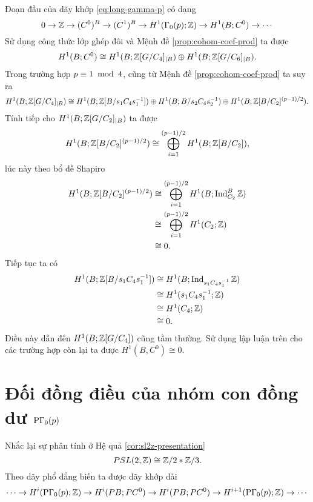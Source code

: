 \startproof Đoạn đầu của dãy khớp \ref{eq:long-gamma-p} có dạng
$$
    0 \rightarrow \mathbb Z \rightarrow (C^0)^B \rightarrow (C^1)^B \rightarrow H^1(\Gamma_0(p); \mathbb Z) \rightarrow H^1(B; C^0) \rightarrow \cdots
$$
Sử dụng công thức lớp ghép đôi và Mệnh đề \ref{prop:cohom-coef-prod} ta được
$$
    H^1(B;C^0) \cong H^1(B; \mathbb Z[G/C_4]_{|B}) \oplus H^1(B;\mathbb Z[G/C_6]_{|B}).
$$
Trong trường hợp $p \equiv 1 \mmod 4$, cũng từ Mệnh đề \ref{prop:cohom-coef-prod} ta suy ra
$$
    H^1(B;\mathbb Z[G/C_4]_{|B}) \cong H^1(B;\mathbb Z[B/s_1C_4s_1^{-1}]) \oplus H^1(B;B/s_2C_4s_2^{-1}) \oplus H^1(B;\mathbb Z[B/C_2]^{(p-1)/2}).
$$
Tính tiếp cho $H^1(B;\mathbb Z[G/C_2]_{|B})$ ta được
$$
    H^1(B;\mathbb Z[B/C_2]^{(p-1)/2}) \cong \bigoplus_{i=1}^{(p-1)/2} H^1(B;\mathbb Z[B/C_2]),
$$
lúc này theo bổ đề Shapiro
\begin{align*}
    H^1(B;\mathbb Z[B/C_2]^{(p-1)/2}) & \cong \bigoplus_{i=1}^{(p-1)/2} H^1(B;\operatorname{Ind}_{C_2}^B\mathbb Z) \\
                               & \cong \bigoplus_{i=1}^{(p-1)/2} H^1(C_2;\mathbb Z)           \\
                               & \cong 0.
\end{align*}
Tiếp tục ta có
\begin{align*}
    H^1(B;\mathbb Z[B/s_1C_4s_1^{-1}]) & \cong H^1(B;\operatorname{Ind}_{s_1C_4s_1^{-1}}\mathbb Z) \\
                                & \cong H^1(s_1C_4s_1^{-1}; \mathbb Z)        \\
                                & \cong H^1(C_4;\mathbb Z)                    \\
                                & \cong 0.
\end{align*}
Điều này dẫn đến $H^1(B;\mathbb Z[G/C_4])$ cũng tầm thường. Sử dụng lập luận trên cho các trường hợp còn lại ta được $H^1(B,C^0) \cong 0$.

\section{Đối đồng điều của nhóm con đồng dư $\operatorname{P\Gamma}_0(p)$}
\begin{lemma}
    Nhắc lại sự phân tính ở Hệ quả \ref{cor:sl2z-presentation}
    $$
        PSL(2,\mathbb Z) \cong \mathbb Z/2 * \mathbb Z/3.
    $$
    Theo dãy phổ đẳng biến ta được dãy khớp dài
    \begin{equation}\label{eq:long-equivariant}
        \cdots \rightarrow H^i(\operatorname{P\Gamma}_0(p);\mathbb Z) \rightarrow H^i(PB; PC^0) \rightarrow H^i(PB;PC^0) \rightarrow H^{i+1}(\operatorname{P\Gamma}_0(p);\mathbb Z) \rightarrow \cdots
    \end{equation}
\end{lemma}

